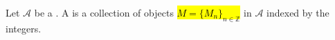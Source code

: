 \begin{definition} \label{definition:graded_object_in_a_category}
    Let $\mathcal{A}$ be a . 
    A  is a collection of objects \hl{$M = \{M_n\}_{n \in \mathbb{Z}}$} in $\mathcal{A}$ indexed by the integers. 
\end{definition}